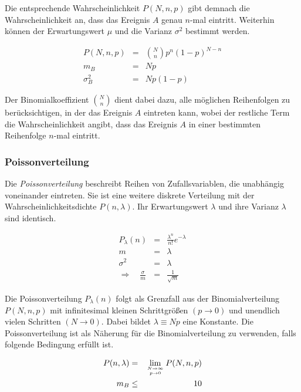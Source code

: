 \documentclass[12pt,a4paper]{scrartcl}
\numberwithin{equation}{section} %
\begin{document}
Die entsprechende  Wahrscheinlichkeit $P(N,n,p)$ gibt demnach die Wahrscheinlichkeit an, dass das Ereignis $A$ genau $n$-mal eintritt. Weiterhin können der Erwartungswert $\mu$ und die Varianz $\sigma^2$ bestimmt werden.

\begin{eqnarray}
	P(N,n,p) &=& \binom{N}{n} p^n (1-p)^{N-n} \\
	m_B &=& Np \\
	\sigma^2_B &=& N p (1-p)
\end{eqnarray}

\noindent
Der Binomialkoeffizient $\binom{N}{n}$ dient dabei dazu, alle möglichen Reihenfolgen zu berücksichtigen, in der das Ereignis $A$ eintreten kann, wobei der restliche Term die Wahrscheinlichkeit angibt, dass das Ereignis $A$ in einer bestimmten Reihenfolge $n$-mal eintritt.

\subsubsection{Poissonverteilung}
\label{Poissonverteilung}
Die \emph{Poissonverteilung} beschreibt Reihen von Zufallsvariablen, die unabhängig voneinander eintreten. Sie ist eine weitere diskrete Verteilung mit der Wahrscheinlichkeitsdichte $P(n,\lambda)$. Ihr Erwartungswert $\lambda$ und ihre Varianz $\lambda$ sind identisch.

\begin{eqnarray}
	P_\lambda(n) &=& \frac{\lambda^n}{n!} e^{-\lambda} \label{eq:poisson} \\
	m &=& \lambda\\
	\sigma^2 &=& \lambda \\
	\Rightarrow\quad \frac{\sigma}{m} &=&\frac{1}{\sqrt{m}} \label{eq:Poisson STD/EW}
\end{eqnarray}

\noindent
Die Poissonverteilung $P_\lambda(n)$ folgt als Grenzfall aus der Binomialverteilung $P(N, n, p)$ mit infinitesimal kleinen Schrittgrößen $(p\rightarrow 0)$ und unendlich vielen Schritten $(N\rightarrow 0)$. Dabei bildet $\lambda\equiv Np$ eine Konstante. Die Poissonverteilung ist als Näherung für die Binomialverteilung zu verwenden, falls folgende Bedingung erfüllt ist.

\begin{eqnarray}
	P(n, \lambda)  &=& \lim_{N \rightarrow \infty \atop p\rightarrow 0} P(N, n, p) \\
	m_B &\leq& 10
\end{eqnarray}
\end{document}
